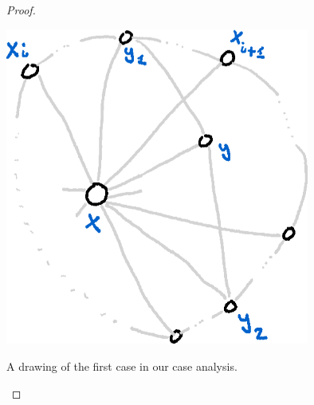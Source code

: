 \documentclass[nobib]{tufte-handout}
\begin{document}
\begin{lemma}
\begin{proof}
    \begin{marginfigure}
      \centering
      \includegraphics[width=0.75\textwidth]{graphics/L11_planarity/w_k_case1.png}
      \caption[]{A drawing of the first case in our case analysis.}
      \label{fig:w_k_case1}
    \end{marginfigure}


\end{proof}
\end{lemma}
\end{document}
